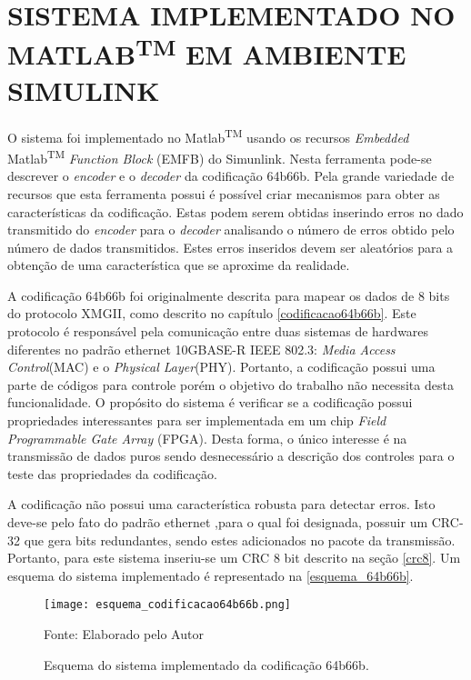 \chapter[SIMULINK]{SISTEMA IMPLEMENTADO NO MATLAB\textsuperscript{TM} EM AMBIENTE SIMULINK} \label{sys:teo}

O sistema foi implementado no Matlab\textsuperscript{TM} usando os recursos \textit{Embedded} Matlab\textsuperscript{TM} \textit{Function Block}  (EMFB) do Simunlink. Nesta ferramenta pode-se descrever o \textit{encoder} e o \textit{decoder} da codificação 64b66b. Pela grande variedade de recursos que esta ferramenta possui é possível criar mecanismos para obter as características da codificação. Estas podem serem obtidas inserindo erros no dado transmitido do \textit{encoder} para o \textit{decoder} analisando o número de erros obtido pelo número de dados transmitidos. Estes erros inseridos devem ser aleatórios para a obtenção de uma característica que se aproxime da realidade.

A codificação 64b66b foi originalmente descrita para mapear os dados de 8 bits do protocolo XMGII, como descrito no capítulo \autoref{codificacao64b66b}. Este protocolo é responsável pela comunicação entre duas sistemas de hardwares diferentes no padrão ethernet 10GBASE-R IEEE 802.3: \textit{Media Access Control}(MAC) e o \textit{Physical Layer}(PHY). Portanto, a codificação possui uma parte de códigos para controle porém o objetivo do trabalho não necessita desta funcionalidade. O propósito do sistema é verificar se a codificação possui propriedades interessantes para ser implementada em um chip \textit{Field Programmable Gate Array }(FPGA). Desta forma, o único interesse é na transmissão de dados puros sendo desnecessário a descrição dos controles para o teste das propriedades da codificação. 

A codificação não possui uma característica robusta para detectar erros. Isto deve-se pelo fato do padrão ethernet ,para o qual foi designada, possuir um CRC-32 que gera bits redundantes, sendo estes adicionados no pacote da transmissão. Portanto, para este sistema inseriu-se um CRC 8 bit descrito na seção \autoref{crc8}. Um esquema do sistema implementado é representado na \autoref{esquema_64b66b}.

\begin{figure}[H]
	
	\caption{\label{esquema_64b66b} Esquema do sistema implementado da codificação 64b66b.}
	\centering
	\texttt{[image: esquema\_codificacao64b66b.png]}
	\begin{center}
		Fonte: Elaborado pelo Autor
	\end{center}	
\end{figure}


